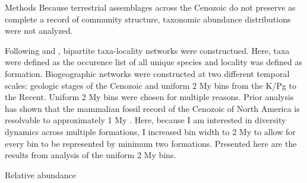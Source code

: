 \documentclass[final]{beamer}\usepackage[]{graphicx}\usepackage[]{color}
\newlength{\onecolwid}
\begin{document}
\begin{frame}[t]
\begin{columns}
\begin{column}{\onecolwid}
\begin{footnotesize}
\begin{block}{Methods}
        Because terrestrial assemblages across the Cenozoic do not preserve as complete a record of community structure, taxonomic abundance distributions were not analyzed.


        Following \citet{Sidor2013} and \citet{Vilhena2013}, bipartite taxa-locality networks were constructued. 
        Here, taxa were defined as the occurence list of all unique species and locality was defined as formation.
        Biogeographic networks were constructed at two different temporal scales: geologic stages of the Cenozoic and uniform 2 My bins from the K/Pg to the Recent. 
        Uniform 2 My bins were chosen for multiple reasons. 
        Prior analysis has shown that the mammalian fossil record of the Cenozoic of North America is resolvable to approximately 1 My \citet{Alroy1996a,Alroy2000g}. 
        Here, because I am interested in diversity dynamics across multiple formations, I increased bin width to 2 My to allow for every bin to be represented by minimum two formations.
        Presented here are the results from analysis of the uniform 2 My bins. 


      \end{block}
      \end{footnotesize}

      \begin{block}{Relative abundance}
      \end{block}
    \end{column}


\end{columns}
\end{frame}
\end{document}
